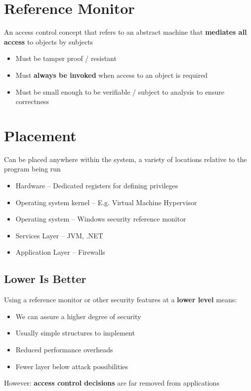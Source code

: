 \documentclass{article}
\begin{document}
\tableofcontents

\newpage

\section{Reference Monitor}
\begin{flushleft}
An access control concept that refers to an abstract machine that
\textbf{mediates all access} to objects by subjects
\end{flushleft}
\begin{itemize}
  \item Must be tamper proof / resistant 
  \item Must \textbf{always be invoked} when access to an object is required 
  \item Must be small enough to be verifiable / subject to analysis to ensure correctness
\end{itemize}

\section{Placement}

\begin{flushleft}
Can be placed anywhere within the system, a variety of locations relative to the program being run
\begin{itemize}
  \item Hardware – Dedicated registers for defining privileges 
  \item Operating system kernel – E.g. Virtual Machine Hypervisor 
  \item Operating system – Windows security reference monitor 
  \item Services Layer – JVM, .NET 
  \item Application Layer – Firewalls
\end{itemize}
\end{flushleft}

\subsection{Lower Is Better}
\begin{flushleft}
Using a reference monitor or other security features at a \textbf{lower level} means:
\begin{itemize}
  \item We can assure a higher degree of security 
  \item Usually simple structures to implement 
  \item Reduced performance overheads 
  \item Fewer layer below attack possibilities
\end{itemize}
However: \textbf{access control decisions} are far removed from applications
\end{flushleft}
\end{document}
